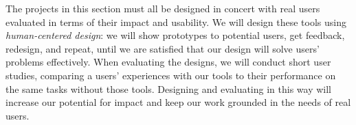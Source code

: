 


\bigskip
{}
The projects in this section must all be designed in concert with real users
evaluated in terms of their impact and usability. We will design these tools
using {\em human-centered design}: we will show prototypes to potential users,
get feedback, redesign, and repeat, until we are satisfied that our design will
solve users' problems effectively. When evaluating the designs, we will conduct
short user studies, comparing a users' experiences with our tools to their
performance on the same tasks without those tools. Designing and evaluating in
this way will increase our potential for impact and keep our work grounded in
the needs of real users.

